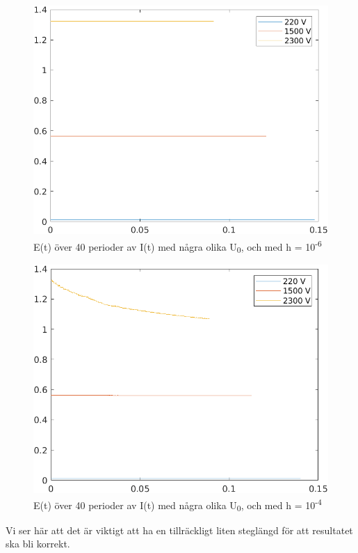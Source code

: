 \documentclass[a4paper, titlepage, 11pt]{article}
\begin{document}
\begin{figure}[H]
  \includegraphics[width=\linewidth]{E-smallH.png}
  \caption{E(t) över 40 perioder av I(t) med några olika U\textsubscript{0}, och med h = 10\textsuperscript{-6}}
\end{figure}

\begin{figure}[H]
  \includegraphics[width=\linewidth]{E-bigH.png}
  \caption{E(t) över 40 perioder av I(t) med några olika U\textsubscript{0}, och med h = 10\textsuperscript{-4}}
\end{figure}

Vi ser här att det är viktigt att ha en tillräckligt liten steglängd för att resultatet ska bli korrekt.
\end{document}

